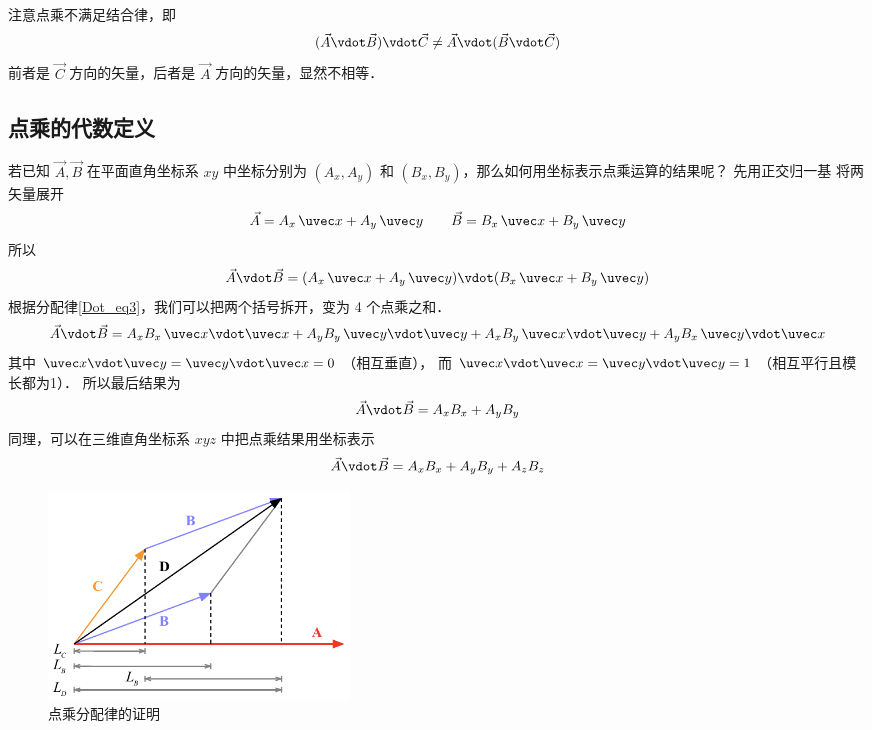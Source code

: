 注意点乘不满足结合律，即
\begin{equation}
(\vec A \vdot \vec B) \vdot \vec C \ne  \vec A \vdot (\vec B \vdot \vec C)
\end{equation}
前者是 $\vec C$ 方向的矢量，后者是 $\vec A$ 方向的矢量，显然不相等．

\subsection{点乘的代数定义}

若已知 $\vec A, \vec B$ 在平面直角坐标系 $xy$ 中坐标分别为 $(A_x, A_y)$ 和  $(B_x, B_y)$，那么如何用坐标表示点乘运算的结果呢？ 先用正交归一基 将两矢量展开 %
\begin{equation}
\vec A = A_x \,\uvec x + A_y \,\uvec y \qquad \vec B = B_x \,\uvec x + B_y \,\uvec y
\end{equation}
所以
\begin{equation}
\vec A \vdot \vec B = (A_x \,\uvec x + A_y \,\uvec y) \vdot (B_x \,\uvec x + B_y \,\uvec y)
\end{equation}
根据分配律\autoref{Dot_eq3}，我们可以把两个括号拆开，变为 4 个点乘之和． 
\begin{equation}
\vec A \vdot \vec B = A_x B_x \,\uvec x \vdot \uvec x + A_y B_y \,\uvec y \vdot \uvec y + A_x B_y \,\uvec x \vdot \uvec y + A_y B_x \,\uvec y \vdot \uvec x
\end{equation}
其中 $\uvec x \vdot \uvec y = \uvec y \vdot \uvec x = 0$ （相互垂直）， 而 $\uvec x \vdot \uvec x = \uvec y \vdot \uvec y = 1$ （相互平行且模长都为1）． 所以最后结果为
\begin{equation}
\vec A \vdot \vec B = A_x B_x + A_y B_y
\end{equation}
同理，可以在三维直角坐标系 $xyz$ 中把点乘结果用坐标表示
\begin{equation}
\vec A \vdot \vec B = A_x B_x + A_y B_y + A_z B_z	
\end{equation}

\begin{figure}[ht]
\centering
\includegraphics[width=8cm]{./figures/Dot2.pdf}
\caption{点乘分配律的证明} \label{Dot_fig2}
\end{figure}

